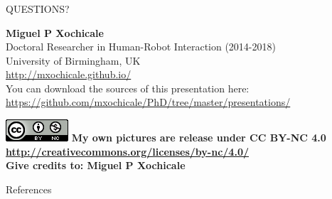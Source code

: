 \documentclass{beamer}
\begin{document}
\begin{frame}
\frametitle{}

\vspace{2cm}
\begin{center}
\LARGE{QUESTIONS?}
\end{center}

\vspace{1cm}

\normalsize
\textbf{Miguel P Xochicale} \\
Doctoral Researcher in Human-Robot Interaction (2014-2018)\\
University of Birmingham, UK \\
{\color{blue} \href{http://mxochicale.github.io/}{http://mxochicale.github.io/ } } \\


\vspace{1cm}
You can download the sources of this presentation here:
{\color{blue} \href{https://github.com/mxochicale/PhD/tree/master/presentations/}{https://github.com/mxochicale/PhD/tree/master/presentations/} }



\includegraphics[scale=.4]{CC4}
\tiny{
\textbf{My own pictures are release under CC BY-NC 4.0
{\color{blue} \href{http://creativecommons.org/licenses/by-nc/4.0/}{http://creativecommons.org/licenses/by-nc/4.0/} } \\
Give credits to: Miguel P Xochicale
}
}

\end{frame}







 \begin{frame}{References}
  \nocite{*}

  
  


%  
\end{frame}






%
\end{document}
